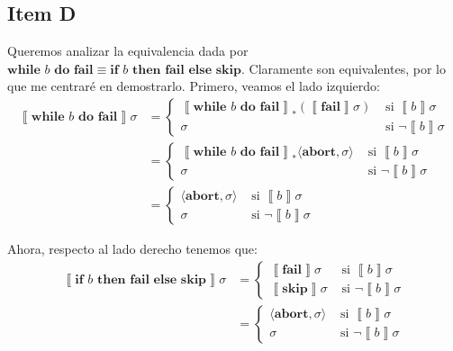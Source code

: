 \documentclass{article}
\newcommand{\sem}[1]{\left\llbracket #1\right\rrbracket}
\newcommand{\cskip}{\textbf{skip}}
\newcommand{\cif}[3]{\textbf{if }#1\textbf{ then }#2\textbf{ else }#3}
\newcommand{\cwhile}[2]{\textbf{while }#1\textbf{ do }#2}
\newcommand{\cfail}{\textbf{fail}}
\newcommand{\cabort}[1]{\langle\textbf{abort}, #1\rangle}
\begin{document}
\subsection*{Item D}
Queremos analizar la equivalencia dada por $\cwhile{b}{\cfail} \equiv \cif{b}{\cfail}{\cskip}$.
Claramente son equivalentes, por lo que me centraré en demostrarlo.
Primero, veamos el lado izquierdo:
\begin{equation*}
  \begin{aligned}
    \sem{\cwhile{b}{\cfail}} \sigma &= \begin{cases}
                                    \sem{\cwhile{b}{\cfail}}_* (\sem{\cfail}\sigma) &\text{ si }\sem{b}\sigma \\ 
                                    \sigma &\text{ si }\neg\sem{b}\sigma
                                  \end{cases} \\ 
                                    &= \begin{cases}
                                      \sem{\cwhile{b}{\cfail}}_* \cabort{\sigma} &\text{ si }\sem{b}\sigma \\ 
                                      \sigma &\text{ si } \neg\sem{b}\sigma
                                    \end{cases} \\ 
                                    &= \begin{cases}
                                      \cabort{\sigma} &\text{ si } \sem{b}\sigma \\ 
                                      \sigma &\text{ si } \neg\sem{b}\sigma
                                    \end{cases}
  \end{aligned}
\end{equation*}

Ahora, respecto al lado derecho tenemos que:
\begin{equation*}
  \begin{aligned}
    \sem{\cif{b}{\cfail}{\cskip}}\sigma &= \begin{cases}
                                        \sem{\cfail}\sigma &\text{ si }\sem{b}\sigma \\ 
                                        \sem{\cskip}\sigma &\text{ si }\neg\sem{b}\sigma
                                      \end{cases} \\ 
                                        &= \begin{cases}
                                          \cabort{\sigma} &\text{ si }\sem{b}\sigma \\ 
                                          \sigma &\text{ si }\neg\sem{b}\sigma
                                        \end{cases}
  \end{aligned}
\end{equation*}
\end{document}
